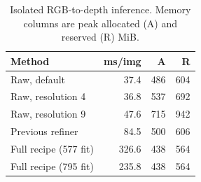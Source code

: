 \begin{table}[t]
\centering\small
\caption{Isolated RGB-to-depth inference. Memory columns are peak allocated (A) and reserved (R) MiB.}
\begin{tabular}{lrrr}
\toprule
Method & ms/img & A & R\\
\midrule
Raw, default & 37.4 & 486 & 604\\
Raw, resolution 4 & 36.8 & 537 & 692\\
Raw, resolution 9 & 47.6 & 715 & 942\\
Previous refiner & 84.5 & 500 & 606\\
Full recipe (577 fit) & 326.6 & 438 & 564\\
Full recipe (795 fit) & 235.8 & 438 & 564\\
\bottomrule
\end{tabular}
\end{table}
